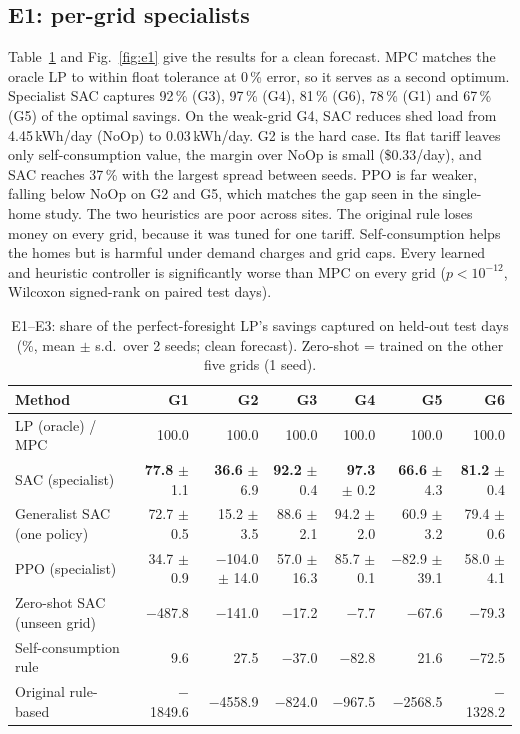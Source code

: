\documentclass[conference]{IEEEtran}
\newcommand{\G}[1]{\textsf{#1}}
\begin{document}
\subsection{E1: per-grid specialists}
Table~\ref{tab:capture} and Fig.~\ref{fig:e1} give the results for a clean
forecast. MPC matches the oracle LP to within float tolerance at 0\,\% error, so
it serves as a second optimum. Specialist SAC captures 92\,\% (\G{G3}), 97\,\%
(\G{G4}), 81\,\% (\G{G6}), 78\,\% (\G{G1}) and 67\,\% (\G{G5}) of the optimal
savings. On the weak-grid \G{G4}, SAC reduces shed load from 4.45\,kWh/day
(NoOp) to 0.03\,kWh/day. \G{G2} is the hard case. Its flat tariff leaves only
self-consumption value, the margin over NoOp is small (\$0.33/day), and SAC
reaches 37\,\% with the largest spread between seeds. PPO is far weaker,
falling below NoOp on \G{G2} and \G{G5}, which matches the gap seen in the
single-home study. The two heuristics are poor across sites. The original rule
loses money on every grid, because it was tuned for one tariff. Self-consumption helps
the homes but is harmful under demand charges and grid caps. Every learned and
heuristic controller is significantly worse than MPC on every grid
($p<10^{-12}$, Wilcoxon signed-rank on paired test days).

\begin{table}[t]
\centering
\caption{E1--E3: share of the perfect-foresight LP's savings captured on held-out test days
(\%, mean $\pm$ s.d.\ over 2 seeds; clean forecast). Zero-shot = trained on the
other five grids (1 seed).}
\label{tab:capture}
\begin{tabular}{lrrrrrr}
\toprule
Method & G1 & G2 & G3 & G4 & G5 & G6 \\
\midrule
LP (oracle) / MPC & 100.0 & 100.0 & 100.0 & 100.0 & 100.0 & 100.0 \\
SAC (specialist) & \textbf{77.8} $\pm$ 1.1 & \textbf{36.6} $\pm$ 6.9 & \textbf{92.2} $\pm$ 0.4 & \textbf{97.3} $\pm$ 0.2 & \textbf{66.6} $\pm$ 4.3 & \textbf{81.2} $\pm$ 0.4 \\
Generalist SAC (one policy) & 72.7 $\pm$ 0.5 & 15.2 $\pm$ 3.5 & 88.6 $\pm$ 2.1 & 94.2 $\pm$ 2.0 & 60.9 $\pm$ 3.2 & 79.4 $\pm$ 0.6 \\
PPO (specialist) & 34.7 $\pm$ 0.9 & $-$104.0 $\pm$ 14.0 & 57.0 $\pm$ 16.3 & 85.7 $\pm$ 0.1 & $-$82.9 $\pm$ 39.1 & 58.0 $\pm$ 4.1 \\
Zero-shot SAC (unseen grid) & $-$487.8 & $-$141.0 & $-$17.2 & $-$7.7 & $-$67.6 & $-$79.3 \\
Self-consumption rule & 9.6 & 27.5 & $-$37.0 & $-$82.8 & 21.6 & $-$72.5 \\
Original rule-based & $-$1849.6 & $-$4558.9 & $-$824.0 & $-$967.5 & $-$2568.5 & $-$1328.2 \\
\bottomrule
\end{tabular}
\end{table}
\end{document}
